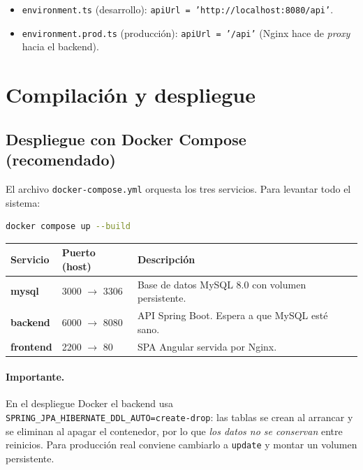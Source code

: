 \documentclass[11pt,a4paper]{article}
\begin{document}
\begin{itemize}[noitemsep]
    \item \texttt{environment.ts} (desarrollo): \texttt{apiUrl =
          'http://localhost:8080/api'}.
    \item \texttt{environment.prod.ts} (producción): \texttt{apiUrl = '/api'}
          (Nginx hace de \emph{proxy} hacia el backend).
\end{itemize}

\section{Compilación y despliegue}

\subsection{Despliegue con Docker Compose (recomendado)}

El archivo \texttt{docker-compose.yml} orquesta los tres servicios. Para
levantar todo el sistema:

\begin{lstlisting}[language=bash]
docker compose up --build
\end{lstlisting}

\begin{longtable}{>{\bfseries}p{2.8cm} p{3.2cm} p{8cm}}
\toprule
\textbf{Servicio} & \textbf{Puerto (host)} & \textbf{Descripción} \\
\midrule
\endhead
mysql & 3000 $\to$ 3306 & Base de datos MySQL 8.0 con volumen persistente. \\
backend & 6000 $\to$ 8080 & API Spring Boot. Espera a que MySQL esté sano. \\
frontend & 2200 $\to$ 80 & SPA Angular servida por Nginx. \\
\bottomrule
\end{longtable}

\paragraph{Importante.} En el despliegue Docker el backend usa
\texttt{SPRING\_JPA\_HIBERNATE\_DDL\_AUTO=create-drop}: las tablas se crean al
arrancar y se eliminan al apagar el contenedor, por lo que \emph{los datos no
se conservan} entre reinicios. Para producción real conviene cambiarlo a
\texttt{update} y montar un volumen persistente.
\end{document}
